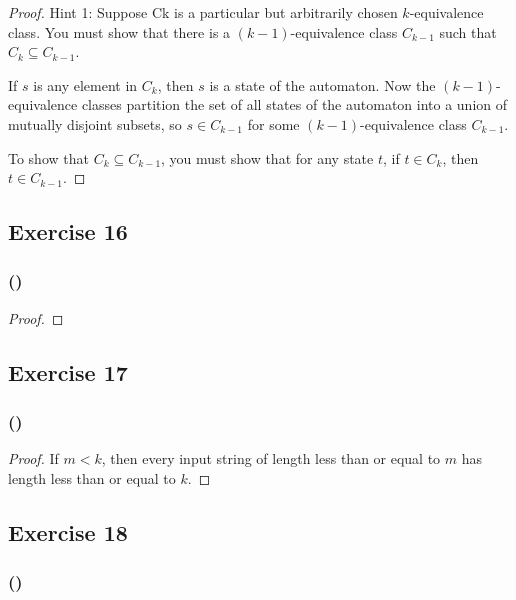 \documentclass[14pt]{extarticle}
\begin{document}
\begin{proof}
Hint 1: Suppose Ck is a particular but arbitrarily chosen \(k\)-equivalence class. You must show that there is a 
\((k - 1)\)-equivalence class \(C_{k-1}\) such that \(C_k \subseteq C_{k-1}\).

If \(s\) is any element in \(C_k\), then \(s\) is a state of the automaton. Now the \((k - 1)\)-equivalence classes 
partition the set of all states of the automaton into a union of mutually disjoint subsets, so \(s \in C_{k-1}\) for some 
\((k - 1)\)-equivalence class \(C_{k-1}\).

To show that \(C_k \subseteq C_{k-1}\), you must show that for any state \(t\), if \(t \in C_k\), then \(t \in C_{k-1}\).
\end{proof}

\subsection{Exercise 16}

\subsubsection{()}

\begin{proof}

\end{proof}

\subsection{Exercise 17}

\subsubsection{()}

\begin{proof}
If \(m < k\), then every input string of length less than or equal to \(m\) has length less than or equal to \(k\).
\end{proof}

\subsection{Exercise 18}

\subsubsection{()}
\end{document}
